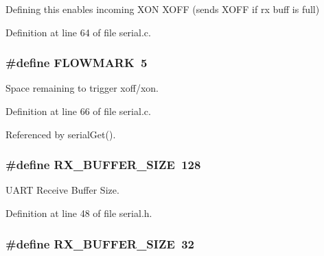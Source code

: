 Defining this enables incoming X\-O\-N X\-O\-F\-F (sends X\-O\-F\-F if rx buff is full) 



Definition at line 64 of file serial.\-c.

\hypertarget{group__uart_gaa7907a070ef8e6d68d7d774b34eebe66}{
\subsubsection[{F\-L\-O\-W\-M\-A\-R\-K}]{\setlength{\rightskip}{0pt plus 5cm}\#define F\-L\-O\-W\-M\-A\-R\-K~5}}\label{group__uart_gaa7907a070ef8e6d68d7d774b34eebe66}


Space remaining to trigger xoff/xon. 



Definition at line 66 of file serial.\-c.



Referenced by serial\-Get().

\hypertarget{group__uart_ga739a2a1a0047c98ac1b18ecd25dac092}{
\subsubsection[{R\-X\-\_\-\-B\-U\-F\-F\-E\-R\-\_\-\-S\-I\-Z\-E}]{\setlength{\rightskip}{0pt plus 5cm}\#define R\-X\-\_\-\-B\-U\-F\-F\-E\-R\-\_\-\-S\-I\-Z\-E~128}}\label{group__uart_ga739a2a1a0047c98ac1b18ecd25dac092}


U\-A\-R\-T Receive Buffer Size. 



Definition at line 48 of file serial.\-h.

\hypertarget{group__uart_ga739a2a1a0047c98ac1b18ecd25dac092}{
\subsubsection[{R\-X\-\_\-\-B\-U\-F\-F\-E\-R\-\_\-\-S\-I\-Z\-E}]{\setlength{\rightskip}{0pt plus 5cm}\#define R\-X\-\_\-\-B\-U\-F\-F\-E\-R\-\_\-\-S\-I\-Z\-E~32}}\label{group__uart_ga739a2a1a0047c98ac1b18ecd25dac092}


